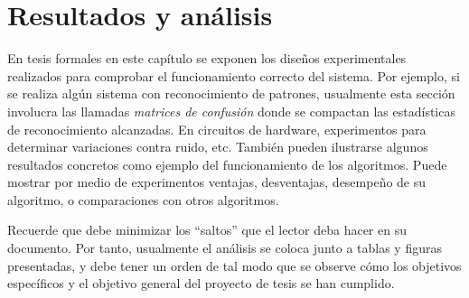 \chapter{Resultados y análisis}

En tesis formales en este capítulo se exponen los diseños experimentales
realizados para comprobar el funcionamiento correcto del sistema. Por ejemplo,
si se realiza algún sistema con reconocimiento de patrones, usualmente esta
sección involucra las llamadas \emph{matrices de confusión} donde se compactan
las estadísticas de reconocimiento alcanzadas. En circuitos de hardware,
experimentos para determinar variaciones contra ruido, etc. También pueden
ilustrarse algunos resultados concretos como ejemplo del funcionamiento de los
algoritmos. Puede mostrar por medio de experimentos ventajas, desventajas,
desempeño de su algoritmo, o comparaciones con otros algoritmos.

Recuerde que debe minimizar los ``saltos'' que el lector deba hacer en
su documento. Por tanto, usualmente el análisis se coloca junto a
tablas y figuras presentadas, y debe tener un orden de tal modo que se
observe cómo los objetivos específicos y el objetivo general del
proyecto de tesis se han cumplido.

